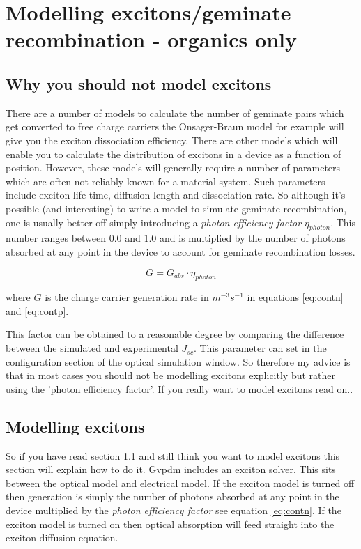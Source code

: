 \chapter{Modelling excitons/geminate recombination - organics only}
\section{Why you should not model excitons}
\label{sec:dont_do_excitions}
There are a number of models to calculate the number of geminate pairs which get converted to free charge carriers the Onsager-Braun model for example will give you the exciton dissociation efficiency.  There are other models which will enable you to calculate the distribution of excitons in a device as a function of position.  However, these models will generally require a number of parameters which are often not reliably known for a material system. Such parameters include exciton life-time, diffusion length and dissociation rate. So although it's possible (and interesting) to write a model to simulate geminate recombination, one is usually better off simply introducing a \emph{photon efficiency factor} $\eta_{photon}$. This number ranges between 0.0 and 1.0 and is multiplied by the number of photons absorbed at any point in the device to account for geminate recombination losses.

\begin{equation}
\label{eq:contn}
G=G_{abs}\cdot \eta_{photon}
\end{equation}

where $G$ is the charge carrier generation rate in $m^{-3}s^{-1}$ in equations \ref{eq:contn} and  \ref{eq:contp}.
 
This factor can be obtained to a reasonable degree by comparing the difference between the simulated and experimental $J_{sc}$.  This parameter can set in the configuration section of the optical simulation window. So therefore my advice is that in most cases you should not be modelling excitons explicitly but rather using the 'photon efficiency factor'. If you really want to model excitons read on..

\section{Modelling excitons}
\label{sec:excitions}
So if you have read section \ref{sec:dont_do_excitions} and still think you want to model excitons this section will explain how to do it.  Gvpdm includes an exciton solver. This sits between the optical model and electrical model.  If the exciton model is turned off then generation is simply the number of photons absorbed at any point in the device multiplied by the \emph{photon efficiency factor} see equation \ref{eq:contn}. If the exciton model is turned on then optical absorption will feed straight into the exciton diffusion equation.

